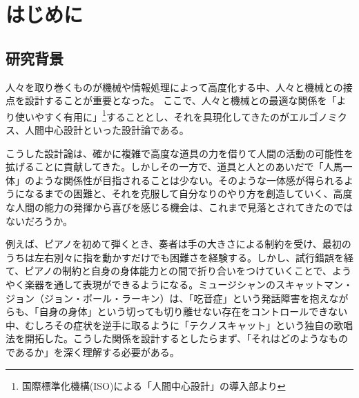 \chapter{はじめに}
\label{introduction}

\section{研究背景}
\label{subject}



人々を取り巻くものが機械や情報処理によって高度化する中、人々と機械との接点を設計することが重要となった。
ここで、人々と機械との最適な関係を「より使いやすく有用に」\footnote{国際標準化機構(ISO)による「人間中心設計」の導入部\cite{hcd}より}することとし、それを具現化してきたのがエルゴノミクス、人間中心設計といった設計論である。



こうした設計論は、確かに複雑で高度な道具の力を借りて人間の活動の可能性を拡げることに貢献してきた。しかしその一方で、道具と人とのあいだで「人馬一体」のような関係性が目指されることは少ない。そのような一体感が得られるようになるまでの困難と、それを克服して自分なりのやり方を創造していく、高度な人間の能力の発揮から喜びを感じる機会は、これまで見落とされてきたのではないだろうか。

例えば、ピアノを初めて弾くとき、奏者は手の大きさによる制約を受け、最初のうちは左右別々に指を動かすだけでも困難さを経験する。しかし、試行錯誤を経て、ピアノの制約と自身の身体能力との間で折り合いをつけていくことで、ようやく楽器を通して表現ができるようになる。ミュージシャンのスキャットマン・ジョン（ジョン・ポール・ラーキン）は、「吃音症」という発話障害を抱えながらも、「自身の身体」という切っても切り離せない存在をコントロールできない中、むしろその症状を逆手に取るように「テクノスキャット」という独自の歌唱法を開拓した。こうした関係を設計するとしたらまず、「それはどのようなものであるか」を深く理解する必要がある。

